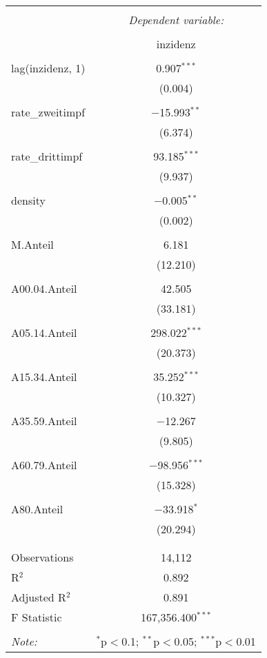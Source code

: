 \documentclass{article}
\begin{document}
\begin{table}[!htbp] \centering 
  \caption{} 
  \label{} 
\begin{tabular}{@{\extracolsep{5pt}}lc} 
\\[-1.8ex]\hline 
\hline \\[-1.8ex] 
 & \multicolumn{1}{c}{\textit{Dependent variable:}} \\ 
\cline{2-2} 
\\[-1.8ex] & inzidenz \\ 
\hline \\[-1.8ex] 
 lag(inzidenz, 1) & 0.907$^{***}$ \\ 
  & (0.004) \\ 
  & \\ 
 rate\_zweitimpf & $-$15.993$^{**}$ \\ 
  & (6.374) \\ 
  & \\ 
 rate\_drittimpf & 93.185$^{***}$ \\ 
  & (9.937) \\ 
  & \\ 
 density & $-$0.005$^{**}$ \\ 
  & (0.002) \\ 
  & \\ 
 M.Anteil & 6.181 \\ 
  & (12.210) \\ 
  & \\ 
 A00.04.Anteil & 42.505 \\ 
  & (33.181) \\ 
  & \\ 
 A05.14.Anteil & 298.022$^{***}$ \\ 
  & (20.373) \\ 
  & \\ 
 A15.34.Anteil & 35.252$^{***}$ \\ 
  & (10.327) \\ 
  & \\ 
 A35.59.Anteil & $-$12.267 \\ 
  & (9.805) \\ 
  & \\ 
 A60.79.Anteil & $-$98.956$^{***}$ \\ 
  & (15.328) \\ 
  & \\ 
 A80.Anteil & $-$33.918$^{*}$ \\ 
  & (20.294) \\ 
  & \\ 
\hline \\[-1.8ex] 
Observations & 14,112 \\ 
R$^{2}$ & 0.892 \\ 
Adjusted R$^{2}$ & 0.891 \\ 
F Statistic & 167,356.400$^{***}$ \\ 
\hline 
\hline \\[-1.8ex] 
\textit{Note:}  & \multicolumn{1}{r}{$^{*}$p$<$0.1; $^{**}$p$<$0.05; $^{***}$p$<$0.01} \\ 
\end{tabular} 
\end{table}
\end{document}
